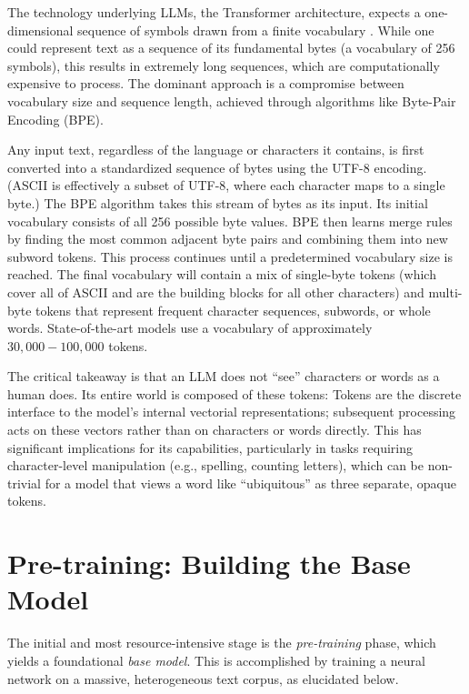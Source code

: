 \documentclass[%
  reprint,
  superscriptaddress,
  showpacs,
  showkeys,
  amsmath,amssymb,
  pra,
  longbibliography,
  floatfix,
  x11names
]{revtex4-2}
\begin{document}
The technology underlying LLMs, the Transformer architecture, expects a one-dimensional sequence of symbols drawn from a finite vocabulary \cite{Vaswani-2017-Attention}. While one could represent text as a sequence of its fundamental bytes (a vocabulary of 256 symbols), this results in extremely long sequences, which are computationally expensive to process. The dominant approach is a compromise between vocabulary size and sequence length, achieved through algorithms like Byte-Pair Encoding (BPE).

Any input text, regardless of the language or characters it contains,
is first converted into a standardized sequence of bytes using the UTF-8 encoding.
(ASCII is effectively a subset of UTF-8, where each character maps to a single byte.)
The BPE algorithm takes this stream of bytes as its input.
Its initial vocabulary consists of all 256 possible byte values.
BPE then learns merge rules by finding the most common adjacent byte pairs
and combining them into new subword tokens.
This process continues until a predetermined vocabulary size is reached.
The final vocabulary will contain a mix of single-byte tokens
(which cover all of ASCII and are the building blocks for all other characters)
and multi-byte tokens that represent frequent character sequences, subwords, or whole words.
State-of-the-art models use a vocabulary of approximately $30,000-100,000$ tokens.

The critical takeaway is that an LLM does not ``see'' characters or words as a human does.
Its entire world is composed of these tokens:
Tokens are the discrete interface to the model's internal vectorial representations; subsequent processing acts on these vectors rather than on characters or words directly.
This has significant implications for its capabilities,
particularly in tasks requiring character-level manipulation (e.g., spelling, counting letters),
which can be non-trivial for a model that views a word like ``ubiquitous'' as three separate, opaque tokens.

\section{Pre-training: Building the Base Model}


The initial and most resource-intensive stage is the \textit{pre-training} phase,
 which yields a foundational \textit{base model}.
This is accomplished by training a neural network on a massive, heterogeneous text corpus, as elucidated below.
\end{document}
